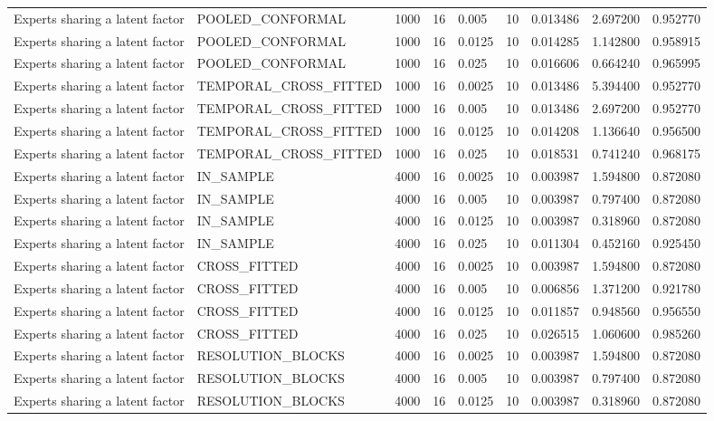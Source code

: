 \begin{tabular}{lllllllll}
Experts sharing a latent factor & POOLED\_CONFORMAL & 1000 & 16 & 0.005 & 10 & 0.013486 & 2.697200 & 0.952770 \\
Experts sharing a latent factor & POOLED\_CONFORMAL & 1000 & 16 & 0.0125 & 10 & 0.014285 & 1.142800 & 0.958915 \\
Experts sharing a latent factor & POOLED\_CONFORMAL & 1000 & 16 & 0.025 & 10 & 0.016606 & 0.664240 & 0.965995 \\
Experts sharing a latent factor & TEMPORAL\_CROSS\_FITTED & 1000 & 16 & 0.0025 & 10 & 0.013486 & 5.394400 & 0.952770 \\
Experts sharing a latent factor & TEMPORAL\_CROSS\_FITTED & 1000 & 16 & 0.005 & 10 & 0.013486 & 2.697200 & 0.952770 \\
Experts sharing a latent factor & TEMPORAL\_CROSS\_FITTED & 1000 & 16 & 0.0125 & 10 & 0.014208 & 1.136640 & 0.956500 \\
Experts sharing a latent factor & TEMPORAL\_CROSS\_FITTED & 1000 & 16 & 0.025 & 10 & 0.018531 & 0.741240 & 0.968175 \\
Experts sharing a latent factor & IN\_SAMPLE & 4000 & 16 & 0.0025 & 10 & 0.003987 & 1.594800 & 0.872080 \\
Experts sharing a latent factor & IN\_SAMPLE & 4000 & 16 & 0.005 & 10 & 0.003987 & 0.797400 & 0.872080 \\
Experts sharing a latent factor & IN\_SAMPLE & 4000 & 16 & 0.0125 & 10 & 0.003987 & 0.318960 & 0.872080 \\
Experts sharing a latent factor & IN\_SAMPLE & 4000 & 16 & 0.025 & 10 & 0.011304 & 0.452160 & 0.925450 \\
Experts sharing a latent factor & CROSS\_FITTED & 4000 & 16 & 0.0025 & 10 & 0.003987 & 1.594800 & 0.872080 \\
Experts sharing a latent factor & CROSS\_FITTED & 4000 & 16 & 0.005 & 10 & 0.006856 & 1.371200 & 0.921780 \\
Experts sharing a latent factor & CROSS\_FITTED & 4000 & 16 & 0.0125 & 10 & 0.011857 & 0.948560 & 0.956550 \\
Experts sharing a latent factor & CROSS\_FITTED & 4000 & 16 & 0.025 & 10 & 0.026515 & 1.060600 & 0.985260 \\
Experts sharing a latent factor & RESOLUTION\_BLOCKS & 4000 & 16 & 0.0025 & 10 & 0.003987 & 1.594800 & 0.872080 \\
Experts sharing a latent factor & RESOLUTION\_BLOCKS & 4000 & 16 & 0.005 & 10 & 0.003987 & 0.797400 & 0.872080 \\
Experts sharing a latent factor & RESOLUTION\_BLOCKS & 4000 & 16 & 0.0125 & 10 & 0.003987 & 0.318960 & 0.872080 \\

\end{tabular}
